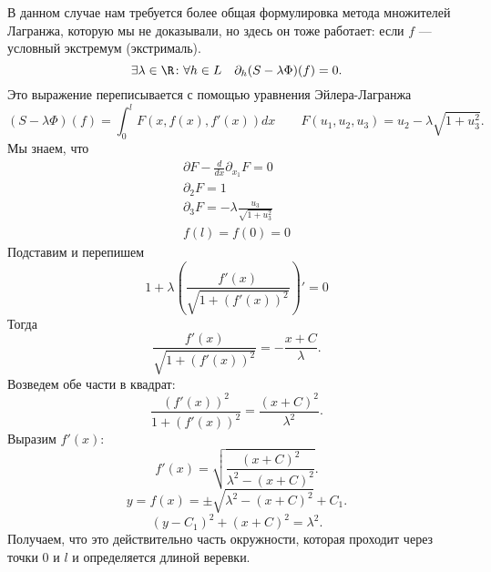 В данном случае нам требуется более общая формулировка метода множителей Лагранжа, которую мы не доказывали, но здесь он тоже работает:
если $ f$ ---  условный экстремум (экстрималь). 
\[
    \exists \lambda \in  \R\colon \forall h \in L \quad \partial _h(S - \lambda \Phi)(f) = 0
.\] 
Это выражение переписывается с помощью уравнения Эйлера-Лагранжа
\[
    (S-\lambda \Phi )(f) = \int_{0}^{l} F(x, f(x), f'(x)) dx  \qquad F(u_1, u_2, u_3) = u_2 - \lambda \sqrt{ 1+u_3^2} 
.\] 
Мы знаем, что
\[
\begin{aligned}
	\partial F - \frac{d}{dx}\partial _{x_1} F = 0\\
	\partial _2 F = 1\\
	\partial _3 F = - \lambda \frac{u_3}{\sqrt{ 1 + u_3^2} } \\
 f(l) = f(0) = 0  
\end{aligned}
\]
Подставим и перепишем
\[
    1 + \lambda \left( \frac{f'(x)}{\sqrt{ 1 + (f'(x))^2} } \right) ' = 0 
\]
Тогда
\[
    \frac{f'(x)}{\sqrt{ 1 + (f'(x))^2} } = - \frac{x +C}{\lambda}
.\] 
Возведем обе части в квадрат:
\[
 \frac{(f'(x))^2}{1+(f'(x))^2} = \frac{(x+ C)^2}{\lambda ^2}
.\] 
Выразим $ f'(x)$:
\[
    f'(x) = \sqrt{ \frac{(x+C)^2}{\lambda^2 - (x+C)^2}}  
.\] 
\[
    y = f(x) = \pm \sqrt{\lambda ^2 - (x + C)^2 } + C _1 
.\] 
\[
    (y- C_1)^2 + (x+C)^2 = \lambda^2
.\] 
Получаем, что это действительно часть окружности, которая проходит через точки $ 0$ и  $ l$ и определяется длиной веревки.
